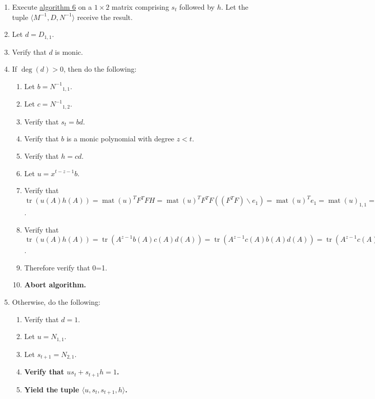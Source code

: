 \documentclass[twocolumn]{article}
\DeclareMathOperator{\mat}{mat}
\DeclareMathOperator{\tr}{tr}
\begin{document}
\begin{enumerate}
\begin{enumerate}
					\item Execute \hyperref[sec:algorithm 6]{algorithm 6} on a $1\times 2$ matrix comprising $s_t$ followed by $h$. Let the tuple $\langle M^{-1},D,N^{-1}\rangle$ receive the result.
					\item Let $d=D_{1,1}$.
					\item Verify that $d$ is monic.
					\item If $\deg(d)>0$, then do the following:
					\begin{enumerate}
						\item Let $b={N^{-1}}_{1,1}$.
						\item Let $c={N^{-1}}_{1,2}$.
						\item Verify that $s_t=bd$.
						\item Verify that $b$ is a monic polynomial with degree $z<t$.
						\item Verify that $h=cd$.
						\item Let $u=x^{t-z-1}b$.
						\item Verify that $\tr(u(A)h(A))=\mat(u)^TF^TFH=\mat(u)^TF^TF((F^TF)\backslash e_1)=\mat(u)^Te_1=\mat(u)_{1,1}=1$.
						\item Verify that $\tr(u(A)h(A))=\tr(A^{z-1}b(A)c(A)d(A))=\tr(A^{z-1}c(A)b(A)d(A))=\tr(A^{z-1}c(A)s_t(A))=\tr(A^{z-1}c(A)0_{m\times m})=\tr(0_{m\times m})=0$.
						\item Therefore verify that 0=1.
						\item \textbf{Abort algorithm.}
					\end{enumerate}
					\item Otherwise, do the following:
					\begin{enumerate}
						\item Verify that $d=1$.
						\item Let $u=N_{1,1}$.
						\item Let $s_{t+1}=N_{2,1}$.
						\item \textbf{Verify that $us_t+s_{t+1}h=1$.}
						\item \textbf{Yield the tuple $\langle u,s_t,s_{t+1},h\rangle$.}
					\end{enumerate}
				\end{enumerate}
			\end{enumerate}
\end{document}
